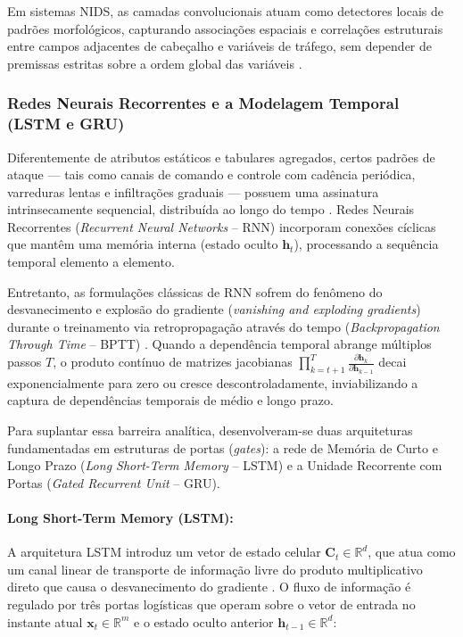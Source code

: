 Em sistemas NIDS, as camadas convolucionais atuam como detectores locais de padrões morfológicos, capturando associações espaciais e correlações estruturais entre campos adjacentes de cabeçalho e variáveis de tráfego, sem depender de premissas estritas sobre a ordem global das variáveis \cite{survey2025dl}.

\subsubsection{Redes Neurais Recorrentes e a Modelagem Temporal (LSTM e GRU)}

Diferentemente de atributos estáticos e tabulares agregados, certos padrões de ataque — tais como canais de comando e controle com cadência periódica, varreduras lentas e infiltrações graduais — possuem uma assinatura intrinsecamente sequencial, distribuída ao longo do tempo \cite{temporal2025, timematters2025}. Redes Neurais Recorrentes (\emph{Recurrent Neural Networks} -- RNN) incorporam conexões cíclicas que mantêm uma memória interna (estado oculto $\mathbf{h}_t$), processando a sequência temporal elemento a elemento.

Entretanto, as formulações clássicas de RNN sofrem do fenômeno do desvanecimento e explosão do gradiente (\emph{vanishing and exploding gradients}) durante o treinamento via retropropagação através do tempo (\emph{Backpropagation Through Time} -- BPTT) \cite{survey2025dl}. Quando a dependência temporal abrange múltiplos passos $T$, o produto contínuo de matrizes jacobianas $\prod_{k=t+1}^T \frac{\partial \mathbf{h}_k}{\partial \mathbf{h}_{k-1}}$ decai exponencialmente para zero ou cresce descontroladamente, inviabilizando a captura de dependências temporais de médio e longo prazo.

Para suplantar essa barreira analítica, desenvolveram-se duas arquiteturas fundamentadas em estruturas de portas (\emph{gates}): a rede de Memória de Curto e Longo Prazo (\emph{Long Short-Term Memory} -- LSTM) e a Unidade Recorrente com Portas (\emph{Gated Recurrent Unit} -- GRU).

\paragraph{Long Short-Term Memory (LSTM):}
A arquitetura LSTM introduz um vetor de estado celular $\mathbf{C}_t \in \mathbb{R}^d$, que atua como um canal linear de transporte de informação livre do produto multiplicativo direto que causa o desvanecimento do gradiente \cite{survey2025dl, temporal2025}. O fluxo de informação é regulado por três portas logísticas que operam sobre o vetor de entrada no instante atual $\mathbf{x}_t \in \mathbb{R}^m$ e o estado oculto anterior $\mathbf{h}_{t-1} \in \mathbb{R}^d$:

